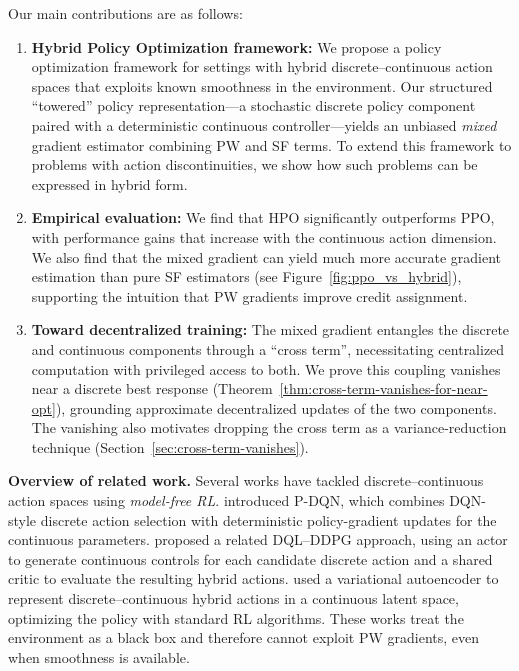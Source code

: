\documentclass{article}
\theoremstyle{definition}
\theoremstyle{remark}
\begin{document}
Our main contributions are as follows:
\begin{enumerate}[leftmargin=*]

    \item \textbf{Hybrid Policy Optimization framework:} We propose a policy optimization framework for settings with hybrid discrete–continuous action spaces that exploits known smoothness in the environment. Our structured ``towered'' policy representation—a stochastic discrete policy component paired with a deterministic continuous controller—yields an unbiased \textit{mixed} gradient estimator combining PW and SF terms. To extend this framework to problems with action discontinuities, we show how such problems can be expressed in hybrid form.
    
    \item \textbf{Empirical evaluation:} We find that HPO significantly outperforms PPO, with performance gains that increase with the continuous action dimension. We also find that the mixed gradient can yield much more accurate gradient estimation than pure SF estimators (see Figure~\ref{fig:ppo_vs_hybrid}), supporting the intuition that PW gradients improve credit assignment.
    
    \item {\bf Toward decentralized training:} The mixed gradient entangles the discrete and
continuous components through a ``cross term'', necessitating centralized computation
with privileged access to both. We prove this coupling vanishes near a discrete best
response (Theorem~\ref{thm:cross-term-vanishes-for-near-opt}), grounding approximate
decentralized updates of the two components. The vanishing also motivates dropping the cross term as a variance-reduction technique (Section~\ref{sec:cross-term-vanishes}).
    
\end{enumerate}


{\bf Overview of related work.}
Several works have tackled discrete--continuous action spaces using \emph{model-free RL}. 
\citet{xiong2018parametrized} introduced P-DQN, which combines DQN-style discrete action selection with deterministic policy-gradient updates for the continuous parameters. 
\citet{huang2022mixed} proposed a related DQL--DDPG approach, using an actor to generate continuous controls for each candidate discrete action and a shared critic to evaluate the resulting hybrid actions. 
\citet{li2021hyar} used a variational autoencoder to represent discrete--continuous hybrid actions in a continuous latent space, optimizing the policy with standard RL algorithms. 
These works treat the environment as a black box and therefore cannot exploit PW gradients, even when smoothness is available.
\end{document}
